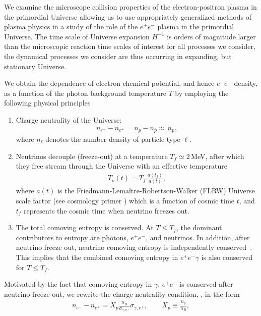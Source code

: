 We examine the microscope collision properties of the electron-positron plasma in the primordial Universe allowing us to use appropriately generalized methods of plasma physics in a study of the role of the $e^+e^-$ plasma in the primordial Universe. The time scale of Universe expansion $H^{-1}$ is orders of magnitude larger than the microscopic reaction time scales of interest for all processes we consider, the dynamical processes we consider are thus occurring in expanding, but stationary Universe.

We obtain the dependence of electron chemical potential, and hence $e^+e^-$ density, as a function of the photon background temperature $T$ by employing the following physical principles
\begin{enumerate}
\item Charge neutrality of the Universe:
\begin{align}\label{neutrality}
n_{e^-}-n_{{e^+}}=n_p-n_{\overline{p}}\approx\,n_p,
\end{align}
where $n_\ell$ denotes the number density of particle type $\ell$.
\item Neutrinos decouple (freeze-out) at a temperature $T_f\simeq 2$\,MeV, after which they free stream through the Universe with an effective temperature~\cite{Birrell:2012gg}
\begin{align}
 T_\nu(t)=T_f\,\frac{a(t_f)}{a(t)},
\end{align}
where $a(t)$ is the Friedmann-Lema\^{i}tre-Robertson-Walker (FLRW) Universe scale factor (see cosmology primer ) which is a function of cosmic time $t$, and $t_f$ represents the cosmic time when neutrino freezes out.
\item The total comoving entropy is conserved. At $T\leq T_f$, the dominant contributors to entropy are photons, $e^+e^-$, and neutrinos. In addition, after neutrino freeze out, neutrino comoving entropy is independently conserved~\cite{Birrell:2012gg}. This implies that the combined comoving entropy in $e^+e^-\gamma$ is also conserved for $T\leq T_f$.
\end{enumerate} 
Motivated by the fact that comoving entropy in $\gamma$, $e^+e^-$ is conserved after neutrino freeze-out, we rewrite the charge neutrality condition, , in the form
\begin{align}\label{charge_neutral_cond2}
n_{e^-}-n_{{e^+}}=X_p\frac{n_B}{\sigma_{\gamma,e^\pm}} \sigma_{\gamma,e^\pm},\qquad X_p\equiv\frac{n_p}{n_B},
\end{align}
